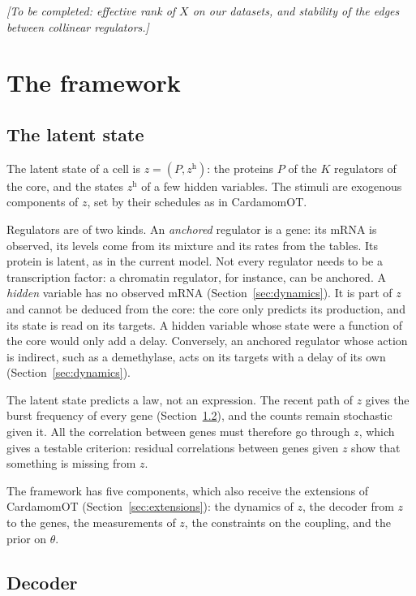 \documentclass[a4paper, 11pt]{article}
\newcommand{\tofill}[1]{\par\smallskip\noindent\emph{[To be completed: #1]}\par\smallskip}
\theoremstyle{plain}
\theoremstyle{remark}
\begin{document}
\tofill{effective rank of $X$ on our datasets, and stability of the edges between collinear regulators.}

\section{The framework}\label{sec:framework}

\subsection{The latent state}

The latent state of a cell is $z = (P, z^{\mathrm{h}})$: the proteins $P$ of the $K$ regulators of the core, and the states $z^{\mathrm{h}}$ of a few hidden variables. The stimuli are exogenous components of $z$, set by their schedules as in CardamomOT.

Regulators are of two kinds. An \emph{anchored} regulator is a gene: its mRNA is observed, its levels come from its mixture and its rates from the tables. Its protein is latent, as in the current model. Not every regulator needs to be a transcription factor: a chromatin regulator, for instance, can be anchored. A \emph{hidden} variable has no observed mRNA (Section~\ref{sec:dynamics}). It is part of $z$ and cannot be deduced from the core: the core only predicts its production, and its state is read on its targets. A hidden variable whose state were a function of the core would only add a delay. Conversely, an anchored regulator whose action is indirect, such as a demethylase, acts on its targets with a delay of its own (Section~\ref{sec:dynamics}).

The latent state predicts a law, not an expression. The recent path of $z$ gives the burst frequency of every gene (Section~\ref{sec:decoder}), and the counts remain stochastic given it. All the correlation between genes must therefore go through $z$, which gives a testable criterion: residual correlations between genes given $z$ show that something is missing from $z$.

The framework has five components, which also receive the extensions of CardamomOT (Section~\ref{sec:extensions}): the dynamics of $z$, the decoder from $z$ to the genes, the measurements of $z$, the constraints on the coupling, and the prior on $\theta$.

\subsection{Decoder}\label{sec:decoder}
\end{document}
